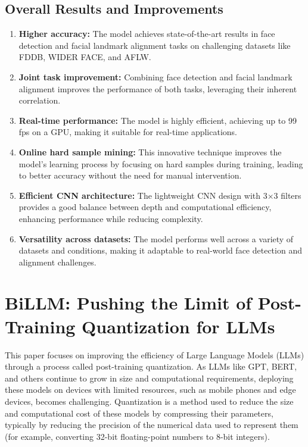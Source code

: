 \documentclass{report}
\begin{document}
	
	
	
	
	
	
	\section{Overall Results and Improvements}
	\begin{enumerate}
		\item 
		\textbf{Higher accuracy:} The model achieves state-of-the-art results in face detection and facial landmark alignment tasks on challenging datasets like FDDB, WIDER FACE, and AFLW.
		
		\item 
		\textbf{Joint task improvement:} Combining face detection and facial landmark alignment improves the performance of both tasks, leveraging their inherent correlation.
		
		\item 
		\textbf{Real-time performance:} The model is highly efficient, achieving up to 99 fps on a GPU, making it suitable for real-time applications.
		
		\item 
		\textbf{Online hard sample mining:} This innovative technique improves the model's learning process by focusing on hard samples during training, leading to better accuracy without the need for manual intervention.
		
		\item 
		\textbf{Efficient CNN architecture:} The lightweight CNN design with 3×3 filters provides a good balance between depth and computational efficiency, enhancing performance while reducing complexity.
		
		\item 
		\textbf{Versatility across datasets:} The model performs well across a variety of datasets and conditions, making it adaptable to real-world face detection and alignment challenges.
	\end{enumerate}
	
	
	
	
	
	
	
	
	
	\chapter{BiLLM: Pushing the Limit of Post-Training Quantization for LLMs \cite{huang2024billmpushinglimitposttraining}}
	
	This paper focuses on improving the efficiency of Large Language Models (LLMs) through a process called post-training quantization. As LLMs like GPT, BERT, and others continue to grow in size and computational requirements, deploying these models on devices with limited resources, such as mobile phones and edge devices, becomes challenging. Quantization is a method used to reduce the size and computational cost of these models by compressing their parameters, typically by reducing the precision of the numerical data used to represent them (for example, converting 32-bit floating-point numbers to 8-bit integers).
	
\end{document}
